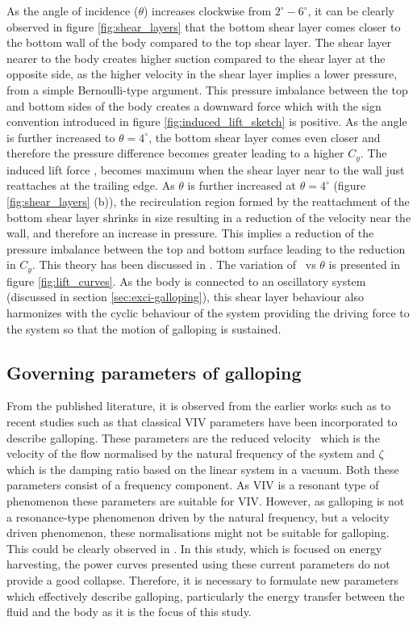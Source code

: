 As the angle of incidence ($\theta$) increases clockwise from $2^{\circ}-6^{\circ}$, it can be clearly observed in figure \ref{fig:shear_layers} that the bottom shear layer comes closer to the bottom wall of the body compared to the top shear layer. The shear layer nearer to the body creates higher suction compared to the shear layer at the opposite side, as the higher velocity in the shear layer implies a lower pressure, from a simple Bernoulli-type argument. This pressure imbalance between the top and bottom sides of the body creates a downward force which with the sign convention introduced in figure \ref{fig:induced_lift_sketch} is positive. As the angle is further increased to $\theta=4^{\circ}$, the bottom shear layer comes even closer and therefore the pressure difference becomes greater leading to a higher $C_{y}$. The induced lift force \cy, becomes maximum when the shear layer near to the wall just reattaches at the trailing edge. As $\theta$ is further increased at  $\theta=4^{\circ}$ (figure \ref{fig:shear_layers} (b)), the recirculation region formed by the reattachment of the bottom shear layer shrinks in size resulting in a reduction of the velocity near the wall, and therefore an increase in pressure. This implies a reduction of the pressure imbalance between the top and bottom surface leading to the reduction in $C_{y}$. This theory has been discussed in \citet{Parkinson1989}. The variation of \cy\ vs $\theta$ is presented in figure \ref{fig:lift_curves}. As the body is connected to an oscillatory system (discussed in section \ref{sec:exci-galloping}), this shear layer behaviour also harmonizes with the cyclic behaviour of the system providing the driving force to the system so that the motion of galloping is sustained.

\subsection{Governing parameters of galloping}

From the published literature, it is observed from the earlier works such as \citet{Parkinson1961,Luo1994} to recent studies such as \citet{Luo2003,Barrero-Gil2010a,Joly2012} that classical VIV parameters have been incorporated to describe galloping. These parameters are the reduced velocity \ustar\ which is the velocity of the flow normalised by the natural frequency of the system and $\zeta$ which is the damping ratio based on the linear system in a vacuum. Both these parameters consist of a frequency component. As VIV is a resonant type of phenomenon these parameters are suitable for VIV. However, as galloping is not a resonance-type phenomenon driven by the natural frequency, but a velocity driven phenomenon, these normalisations might not be suitable for galloping. This could be clearly observed in \citet{Barrero-Gil2010a}. In this study, which is focused on energy harvesting, the power curves presented using these current parameters do not provide a good collapse. Therefore, it is necessary to formulate new parameters which effectively describe galloping, particularly the energy transfer between the fluid and the body as it is the focus of this study.     


